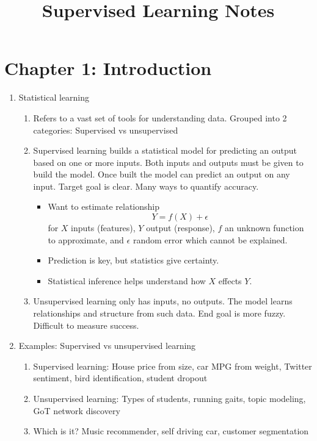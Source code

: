\documentclass{article}
\title{Supervised Learning Notes}
\date
\begin{document}
\maketitle
\large


\tableofcontents
\pagebreak

\section*{Chapter 1: Introduction}

\begin{enumerate}
\item Statistical learning
\begin{enumerate}
\item Refers to a vast set of tools for understanding data. Grouped into 2 categories: Supervised vs unsupervised
\item Supervised learning builds a statistical model for predicting an output based on one or more inputs. Both inputs and outputs must be given to build the model. Once built the model can predict an output on any input. Target goal is clear. Many ways to quantify accuracy.
\begin{itemize}
\item Want to estimate relationship
\[
Y = f(X) + \epsilon
\]
for $X$ inputs (features), $Y$ output (response), $f$ an unknown function to approximate, and $\epsilon$ random error which cannot be explained.
\item Prediction is key, but statistics give certainty.
\item Statistical inference helps understand how $X$ effects $Y$.
\end{itemize}
\item Unsupervised learning only has inputs, no outputs. The model learns relationships and structure from such data. End goal is more fuzzy. Difficult to measure success. 
\end{enumerate}

\item Examples: Supervised vs unsupervised learning
\begin{enumerate}
\item Supervised learning: House price from size, car MPG from weight, Twitter sentiment, bird identification, student dropout
\item Unsupervised learning: Types of students, running gaits, topic modeling, GoT network discovery
\item Which is it? Music recommender, self driving car, customer segmentation
\end{enumerate}


\end{enumerate}
\end{document}
